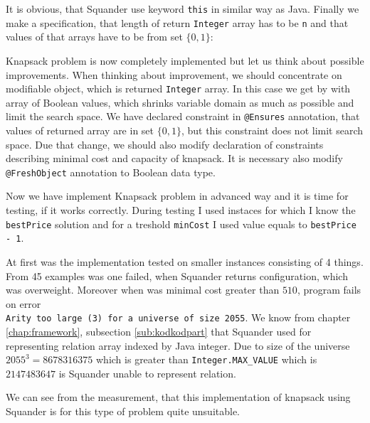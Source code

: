\documentclass[11pt,twoside,a4paper]{book}
\begin{document}


It is obvious, that Squander use keyword \verb|this| in similar way as Java.
Finally we make a specification, that length of return \verb|Integer| array has
to be \verb|n| and that values of that arrays have to be from set $\{0, 1\}$:



Knapsack problem is now completely implemented but let us think about possible
improvements. When thinking about improvement, we should concentrate on
modifiable object, which is returned \verb|Integer| array. In this case we get
by with array of Boolean values, which shrinks variable domain as much as possible
and limit the search space. We have declared constraint in \verb|@Ensures|
annotation, that values of returned array are in set $\{0, 1\}$, but this
constraint does not limit search space. Due that change, we should also modify
declaration of constraints describing minimal cost and capacity of knapsack. It
is necessary also modify \verb|@FreshObject| annotation to Boolean data type.
\newpage


Now we have implement Knapsack problem in advanced way and it is time for
testing, if it works correctly. During testing I used instaces for which I
know the \verb|bestPrice| solution and for a treshold \verb|minCost| I used
value equals to \verb|bestPrice - 1|.

At first was the implementation tested on smaller instances consisting of 4
things. From 45 examples was one failed, when Squander returns configuration,
which was overweight. Moreover when was minimal cost greater than $510$, program
fails on error\\ \verb|Arity too large (3) for a universe of size 2055|. We know
from chapter \ref{chap:framework}, subsection \ref{sub:kodkodpart} that Squander
used for representing relation array indexed by Java integer. Due to size of
the universe $2055^3 = 8678316375$ which is greater than
\verb|Integer.MAX_VALUE| which is $2147483647$ is Squander unable to represent relation.

We can see from the measurement, that this implementation of knapsack
using Squander is for this type of problem quite unsuitable.
\end{document}
